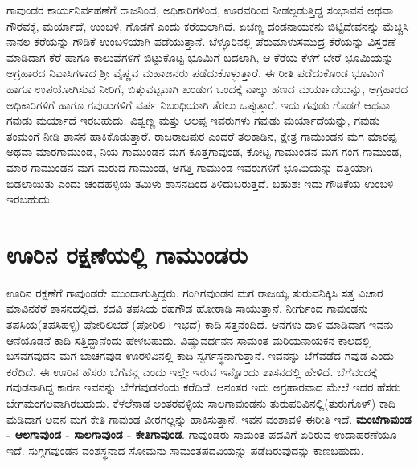 ಗಾವುಂಡರ ಕಾರ್ಯನಿರ್ವಹಣೆಗೆ ರಾಜನಿಂದ, ಅಧಿಕಾರಿಗಳಿಂದ, ಊರವರಿಂದ ನೀಡಲ್ಪಡುತ್ತಿದ್ದ ಸಂಭಾವನೆ ಅಥವಾ ಗೌರವಕ್ಕೆ, ಮರ್ಯಾದೆ, ಉಂಬಳಿ, ಗೊಡಗೆ ಎಂದು ಕರೆಯಲಾಗಿದೆ. ಏಚಣ್ಣ ದಂಡನಾಯಕನು ಬಿಟ್ಟಿದೇವನನ್ನು ಮೆಚ್ಚಿಸಿ ನಾನಲ ಕೆರೆಯನ್ನು ಗೌಡಿಕೆ ಉಂಬಳಿಯಾಗಿ ಪಡೆಯುತ್ತಾನೆ. ಬೆಳ್ಳೂರಿನಲ್ಲಿ ಪೆರುಮಾಳುಸಮುದ್ರ ಕೆರೆಯನ್ನು ವಿಸ್ತರಣೆ ಮಾಡಿದಾಗ ಕೆರೆ ಹಾಗೂ ಕಾಲುವೆಗಳಿಗೆ ಬಿಟ್ಟುಕೊಟ್ಟ ಭೂಮಿಗೆ ಬದಲಾಗಿ, ಆ ಕೆರೆಯ ಕೆಳಗೆ ಬೇರೆ ಭೂಮಿಯನ್ನು ಅಗ್ರಹಾರದ ನಿವಾಸಿಗಳಾದ ಶ‍್ರೀ ವೈಷ್ಣವ ಮಹಾಜನರು ಪಡೆದುಕೊಳ್ಳುತ್ತಾರೆ. ಈ ರೀತಿ ಪಡೆದುಕೊಂಡ ಭೂಮಿಗೆ ಹಾಗೂ ಉಪಯೋಗಿಸುವ ನೀರಿಗೆ, ಬಿತ್ತುವಟ್ಟವಾಗಿ ಖಂಡುಗ ಒಂದಕ್ಕೆ ನಾಲ್ಕು ಹಣದ ಮರ್ಯಾದೆಯನ್ನು, ಅಗ್ರಹಾರದ ಅಧಿಕಾರಿಗಳಿಗೆ ಹಾಗೂ ಗವುಡುಗಳಿಗೆ ವರ್ಷ ನಿಬಂಧಿಯಾಗಿ ತೆರಲು ಒಪ್ಪುತ್ತಾರೆ. ಇದು ಗವುಡು ಗೊಡಗೆ ಆಥವಾ ಗವುಡು ಮರ್ಯಾದೆ ಇರಬಹುದು. ವಿಶ್ವಣ್ಣ ಮತ್ತು ಆಲಪ್ಪ ಇವರುಗಳು ಗವುಡು ಮರ್ಯಾದೆಯನ್ನು, ಗವುಡು ತಂಮಂಗೆ ನೀಡಿ ಶಾಸನ ಹಾಕಿಕೊಡುತ್ತಾರೆ. ರಾಜರಾಜಪುರ ಎಂದರೆ ತಲಕಾಡಿನ, ಕ್ಷೇತ್ರ ಗಾಮುಂಡನ ಮಗ ಮಾರಪ್ಪ ಅಥವಾ ಮಾರಗಾಮುಂಡ, ನಿಯ ಗಾಮುಂಡನ ಮಗ ಕೂತ್ತಗಾವುಂಡ, ಕೋಟ್ಟ ಗಾಮುಂಡನ ಮಗ ಗಂಗ ಗಾಮುಂಡ, ಮಾರ ಗಾಮುಂಡನ ಮಗ ಮರುದ ಗಾಮುಂಡ, ಅಗತ್ತಿ ಗಾಮುಂಡ ಇವರುಗಳಿಗೆ ಭೂಮಿಯನ್ನು ದತ್ತಿಯಾಗಿ ಬಿಡಲಾಯಿತು ಎಂದು ಚಂದಹಳ್ಳಿಯ ತಮಿಳು ಶಾಸನದಿಂದ ತಿಳಿದುಬರುತ್ತದೆ. ಬಹುಶಃ ಇದು ಗೌಡಿಕೆಯ ಉಂಬಳಿ ಇರಬಹುದು.


\section*{ಊರಿನ ರಕ್ಷಣೆಯಲ್ಲಿ ಗಾಮುಂಡರು}

ಊರಿನ ರಕ್ಷಣೆಗೆ ಗಾವುಂಡರೇ ಮುಂದಾಗುತ್ತಿದ್ದರು. ಗಂಗಿಗವುಂಡನ ಮಗ ರಾಜಯ್ಯ ತುರುವನಿಕ್ಕಿಸಿ ಸತ್ತ ವಿಚಾರ ಮಾವಿನಕೆರೆ ಶಾಸನದಲ್ಲಿದೆ. ಕದವಿ ತಪಸಿಯ ರಹಗೌಡ ಹೋರಾಡಿ ಸಾಯುತ್ತಾನೆ. ನೀರ್ಗುಂದ ಗಾವುಂಡನು ತಪಸಿಯ(ತಪಸಿಹಳ್ಳಿ) ಪೋರಿಲಿಭದೆ (ಪೋರಿಲಿ+ಇಭದೆ) ಕಾದಿ ಸತ್ತನೆಂದಿದೆ. ಆನೆಗಳು ದಾಳಿ ಮಾಡಿದಾಗ ಇವನು ಆನೆಯೊಡನೆ ಕಾದಿ ಸತ್ತಿದ್ದಾನೆಂದು ಹೇಳಬಹುದು. ವಿಷ್ಣುವರ್ಧನನ ಸಾಮಂತ ಮರಿಯನಾಯಕನ ಕಾಲದಲ್ಲಿ ಬಸವಗವುಡನ ಮಗ ಬಾಚಗವುಡ ಊರಳಿವಿನಲ್ಲಿ ಕಾದಿ ಸ್ವರ್ಗಸ್ಥನಾಗುತ್ತಾನೆ. ಇವನನ್ನು ಬೆಗೆವಡೆದ ಗವುಡ ಎಂದು ಕರೆದಿದೆ. ಈ ಊರಿನ ಹೆಸರು ಬೆಗೆವನ್ದ ಎಂದು ಇಲ್ಲೇ ಇರುವ ಇನ್ನೊಂದು ಶಾಸನದಲ್ಲಿ ಹೇಳಿದೆ. ಬೆಗೆವಂದಕ್ಕೆ ಗವುಡನಾಗಿದ್ದ ಕಾರಣ ಇವನನ್ನು ಬೆಗೆಗವುಡನೆಂದು ಕರೆದಿದೆ. ಆನಂತರ ಇದು ಅಗ್ರಹಾರವಾದ ಮೇಲೆ ಇದರ ಹೆಸರು ಬೇಗಮಂಗಲವಾಗಿರಬಹುದು. ಕೆಳಲೆನಾಡ ಅಂತರವಳ್ಳಿಯ ಸಾಲಗಾವುಂಡನು ತುರುಪರಿವಿನಲ್ಲಿ(ತುರುಗೊಳ್​) ಕಾದಿ ಮಡಿದಾಗ ಅವನ ಮಗ ಕೇತಿ ಗಾವುಂಡ ವೀರಗಲ್ಲನ್ನು ಹಾಕಿಸುತ್ತಾನೆ. ಇವನ ವಂಶಾವಳಿ ಈರೀತಿ ಇದೆ. \textbf{ಮಂಚೆಗಾವುಂಡ - ಆಲಗಾವುಂಡ - ಸಾಲಗಾವುಂಡ - ಕೇತಿಗಾವುಂಡ}. ಗಾವುಂಡರು ಸಾಮಂತ ಪದವಿಗೆ ಏರಿರುವ ಉದಾಹರಣೆಯೂ ಇದೆ. ಸುಗ್ಗಗವುಂಡನ ವಂಶಸ್ಥನಾದ ಸೋಮನು ಸಾಮಂತಪದವಿಯನ್ನು ಪಡೆದಿರುವುದನ್ನು ಕಾಣಬಹುದು.


